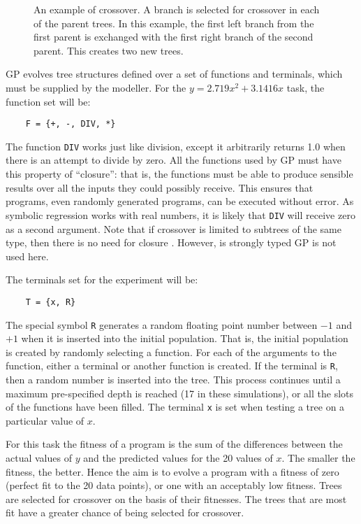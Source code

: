 \begin{figure}
\centerline{}
\caption{An example of crossover. A branch is selected for crossover in
each of the parent trees. In this example, the
first left branch from the first
parent is exchanged with the first right branch of the second parent. This
creates two new trees.}\label{crossover}
\end{figure}

GP evolves tree structures defined over a set of functions and terminals,
which must be supplied
by the modeller. For the $y=2.719x^2+3.1416x$ task, the
function set will be:
\begin{verbatim}
    F = {+, -, DIV, *}
\end{verbatim}

The function \verb|DIV| works just like division, except it arbitrarily
returns 1.0 when there is an attempt to divide by zero.  All the functions
used by GP must have this property of ``closure'': that is, the functions
must be able to produce sensible results over all the inputs they could
possibly receive.
This ensures that programs, even randomly generated programs, can be
executed without error. As symbolic regression works with real
numbers, it is likely that \verb|DIV| will receive zero as a second
argument.  Note that if
crossover is limited to subtrees of the same type, then there
is no need for closure \cite{montstro}.  However, is strongly typed GP is
not used here.

The terminals set for the experiment will be:
\begin{verbatim}
    T = {x, R}
\end{verbatim}

The special symbol \verb|R| generates a random floating point number
between $-1$
and $+1$ when it is inserted into the initial population.  That is,
the initial population is created by randomly selecting a function. For
each of the arguments to the function, either a terminal or another
function is created. If the terminal is \verb|R|, then a random number is
inserted into the tree.  This process continues until a maximum
pre-specified depth
is reached (17 in these simulations),
or all the slots of the functions have been filled.  The
terminal
\verb|x| is set when testing a tree on a particular value of $x$.

For this task the fitness of a program is the sum of the differences
between the actual values of $y$ and the predicted values for the 20 values
of $x$.  The smaller the fitness, the better.  Hence the aim is to evolve a
program with a fitness of zero (perfect fit to the 20 data points), or one
with an acceptably low fitness.
Trees are selected for crossover on the basis of their fitnesses.  The
trees that are most fit have a greater chance of being selected for
crossover.

